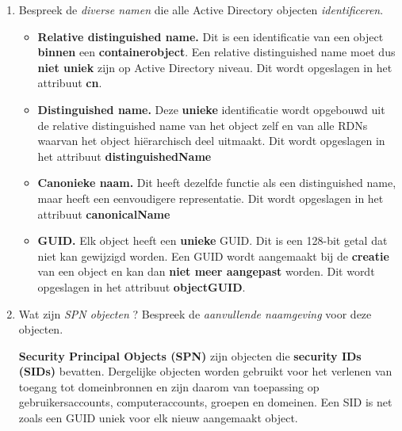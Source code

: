 \documentclass{report}
\newcommand{\vraag}[2]{
	\item #1
	
	#2
}
\begin{document}
	\begin{enumerate}
		\vraag { Bespreek de \textit{diverse namen} die alle Active Directory objecten \textit{identificeren}. \accentuate{\textsection 2.2.1} } 
		{ 
			\begin{itemize}
				\item \textbf{Relative distinguished name.} Dit is een identificatie van een object \textbf{binnen} een \textbf{containerobject}. Een relative distinguished name moet dus \textbf{niet uniek} zijn op Active Directory niveau. Dit wordt opgeslagen in het attribuut \textbf{cn}.
				
				\item \textbf{Distinguished name.} Deze \textbf{unieke} identificatie wordt opgebouwd uit de relative distinguished name van het object zelf en van alle RDNs waarvan het object hiërarchisch deel uitmaakt. Dit wordt opgeslagen in het attribuut \textbf{distinguishedName}
				
				\item \textbf{Canonieke naam.} Dit heeft dezelfde functie als een distinguished name, maar heeft een eenvoudigere representatie. Dit wordt opgeslagen in het attribuut \textbf{canonicalName}
				
				\item \textbf{GUID.} Elk object heeft een \textbf{unieke} GUID. Dit is een 128-bit getal dat niet kan gewijzigd worden. Een GUID wordt aangemaakt bij de \textbf{creatie} van een object en kan dan \textbf{niet meer aangepast} worden. Dit wordt opgeslagen in het attribuut \textbf{objectGUID}.
			\end{itemize}
		
		}	
		\vraag { Wat zijn \textit{SPN objecten} ? Bespreek de \textit{aanvullende naamgeving} voor deze objecten. \accentuate{ (\textsection 2.2.2)} } { 
			\textbf{Security Principal Objects (SPN)} zijn objecten die \textbf{security IDs (SIDs)} bevatten. Dergelijke objecten worden gebruikt voor het verlenen van toegang tot domeinbronnen en zijn daarom van toepassing op gebruikersaccounts, computeraccounts, groepen en domeinen. Een SID is net zoals een GUID uniek voor elk nieuw aangemaakt object.
			
			
		}
		

\end{enumerate}
\end{document}
